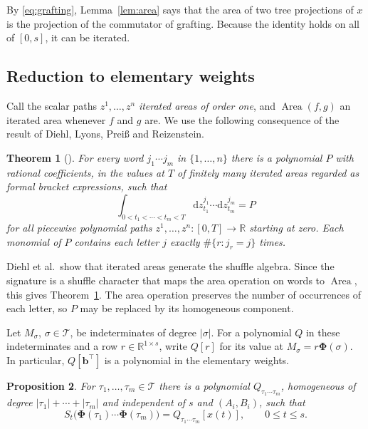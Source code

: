 \documentclass[11pt]{article}
\newtheorem{theorem}{Theorem}[section]
\newtheorem{proposition}[theorem]{Proposition}
\theoremstyle{remark}
\newcommand{\bb}{\mathbf b}
\newcommand{\bPhi}{\boldsymbol\Phi}
\newcommand{\Area}{\operatorname{Area}}
\begin{document}
By \eqref{eq:grafting}, Lemma~\ref{lem:area} says that the area of two tree projections of $x$ is the projection of the commutator of grafting. Because the identity holds on all of $[0,s]$, it can be iterated.



\subsection{Reduction to elementary weights}

Call the scalar paths $z^1,\ldots,z^n$ \emph{iterated areas of order one}, and $\Area(f,g)$ an iterated area whenever $f$ and $g$ are. We use the following consequence of the result of Diehl, Lyons, Prei\ss{} and Reizenstein.

\begin{theorem}[{\cite[Corollary~4.8]{diehl2020areas}}]
\label{thm:generation}
For every word $j_1\cdots j_m$ in $\{1,\ldots,n\}$ there is a polynomial $P$ with rational coefficients, in the values at $T$ of finitely many iterated areas regarded as formal bracket expressions, such that
\[
\int_{0<t_1<\cdots<t_m<T}\mathrm dz^{j_1}_{t_1}\cdots\mathrm dz^{j_m}_{t_m}=P
\]
for all piecewise polynomial paths $z^1,\ldots,z^n:[0,T]\to\mathbb R$ starting at zero. Each monomial of $P$ contains each letter $j$ exactly $\#\{r:j_r=j\}$ times.
\end{theorem}

Diehl et al.\ show that iterated areas generate the shuffle algebra. Since the signature is a shuffle character that maps the area operation on words to $\Area$, this gives Theorem~\ref{thm:generation}. The area operation preserves the number of occurrences of each letter, so $P$ may be replaced by its homogeneous component.

Let $M_\sigma$, $\sigma\in\mathcal T$, be indeterminates of degree $|\sigma|$. For a polynomial $Q$ in these indeterminates and a row $r\in\mathbb R^{1\times s}$, write $Q[r]$ for its value at $M_\sigma=r\bPhi(\sigma)$. In particular, $Q[\bb^\top]$ is a polynomial in the elementary weights.

\begin{proposition}
\label{prop:weights}
For $\tau_1,\ldots,\tau_m\in\mathcal T$ there is a polynomial $Q_{\tau_1\cdots\tau_m}$, homogeneous of degree $|\tau_1|+\cdots+|\tau_m|$ and independent of $s$ and $(A_i,B_i)$, such that
\[
S_t\bigl(\bPhi(\tau_1)\cdots\bPhi(\tau_m)\bigr)=Q_{\tau_1\cdots\tau_m}[x(t)],\qquad 0\leq t\leq s.
\]
\end{proposition}
\end{document}
